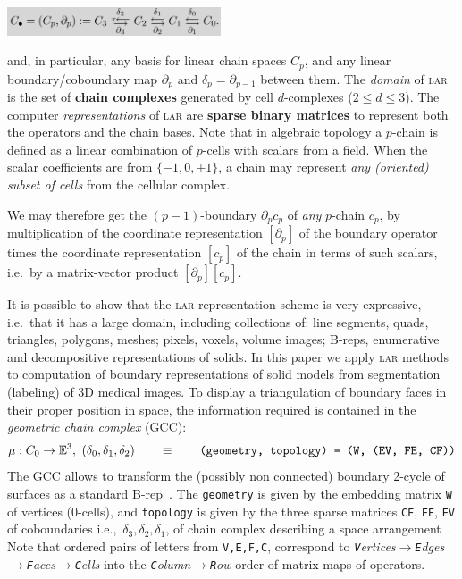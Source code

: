 \documentclass[11pt, oneside]{amsart}   	%
\begin{document}
{   
   \centering\vspace{1mm}
   \includegraphics[width=0.475\textwidth]{figs/complex} 

}

\noindent
and, in particular, any basis for linear chain spaces $C_p$, and any linear
boundary/coboundary map \(\partial_p\) and
\(\delta_p=\partial_{p-1}^\top\) between them. The \emph{domain} of \textsc{lar} is the set of \textbf{chain complexes} generated by cell $d$-complexes ($2\leq d\leq 3$). The computer \emph{representations} of \textsc{lar} are \textbf{sparse binary matrices} to represent both the operators and the chain bases. Note that in algebraic topology a $p$-chain is defined as a linear combination of $p$-cells with scalars from a field. When the scalar coefficients are from $\{-1, 0, +1\}$, a chain may represent \emph{any (oriented) subset of cells} from the cellular complex. 

We may therefore get the $(p-1)$-boundary $\partial_p c_p$ of \emph{any} $p$-chain $c_p$, by multiplication of the coordinate representation $[\partial_p]$ of the boundary operator times the coordinate representation $[c_p]$ of the chain in terms of such scalars, i.e.~by a  matrix-vector product $ [\partial_p] [c_p] $.

It is possible to show that the \textsc{lar} representation scheme is very expressive, i.e.~that it  has a large domain,  including collections of: line segments, quads, triangles, polygons, meshes;  pixels, voxels, volume images; B-reps, enumerative and decompositive representations of solids. 
In this paper we apply \textsc{lar} methods to computation of boundary representations of solid models from segmentation (labeling) of 3D medical images.
To display a triangulation of  boundary faces  in their proper position in space, the information required is contained in the \emph{geometric chain complex} (GCC):
\[
\mu: C_0\to\mathbb{E}^3,\ (\delta_0, \delta_1, \delta_2)
\qquad\equiv\qquad
\texttt{(geometry, topology) = (W, (EV, FE, CF))}
\]
The GCC allows to transform the (possibly non connected) boundary 2-cycle of surfaces as a standard B-rep~\cite{shapiroSM:202}. 
The \texttt{geometry} is given by
the embedding matrix \texttt{W} of vertices (0-cells), and \texttt{topology} is
given by the three sparse matrices \texttt{CF}, \texttt{FE}, \texttt{EV} of coboundaries
{i.e.},~$\delta_3, \delta_2, \delta_1$, of  chain complex describing a   
space arrangement~\cite{paoluzzi2019finite}.
Note that ordered pairs of letters from \texttt{V,E,F,C}, correspond to \emph{\emph{\texttt{V}}ertices$\to$\emph{\texttt{E}}dges$\to$\emph{\texttt{F}}aces$\to$\emph{\texttt{C}}ells} into the 
\emph{\emph{\texttt{C}}olumn$\to$\emph{\texttt{R}}ow} order of matrix maps of operators.
\end{document}

